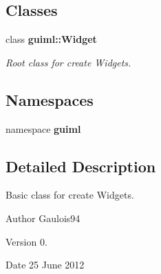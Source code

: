 \subsection*{Classes}
\begin{DoxyCompactItemize}
\item 
class {\bf guiml\-::\-Widget}
\begin{DoxyCompactList}\small\item\em Root class for create Widgets. \end{DoxyCompactList}\end{DoxyCompactItemize}
\subsection*{Namespaces}
\begin{DoxyCompactItemize}
\item 
namespace {\bf guiml}
\end{DoxyCompactItemize}


\subsection{Detailed Description}
Basic class for create Widgets. \begin{DoxyAuthor}{Author}
Gaulois94 
\end{DoxyAuthor}
\begin{DoxyVersion}{Version}
0. 
\end{DoxyVersion}
\begin{DoxyDate}{Date}
25 June 2012 
\end{DoxyDate}
